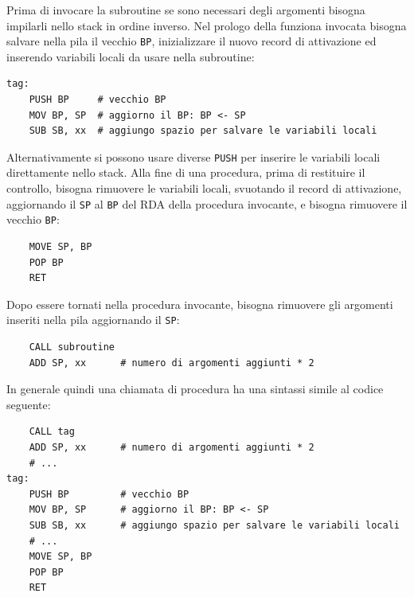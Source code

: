 \documentclass{article}
\numberwithin{equation}{subsection}
\begin{document}
Prima di invocare la subroutine se sono necessari degli argomenti bisogna impilarli nello stack in ordine inverso. 
Nel prologo della funziona invocata bisogna salvare nella pila il vecchio \verb|BP|, inizializzare il nuovo record di attivazione ed inserendo variabili locali da usare nella 
subroutine:
\begin{verbatim}
tag:
    PUSH BP     # vecchio BP
    MOV BP, SP  # aggiorno il BP: BP <- SP
    SUB SB, xx  # aggiungo spazio per salvare le variabili locali
\end{verbatim}
Alternativamente si possono usare diverse \verb|PUSH| per inserire le variabili locali direttamente nello stack. Alla fine di una procedura, prima di restituire il controllo, 
bisogna rimuovere le variabili locali, svuotando il record di attivazione, aggiornando il \verb|SP| al \verb|BP| del RDA della procedura invocante, e bisogna rimuovere il vecchio \verb|BP|:
\begin{verbatim}
    MOVE SP, BP
    POP BP
    RET
\end{verbatim}
Dopo essere tornati nella procedura invocante, bisogna rimuovere gli argomenti inseriti nella pila aggiornando il \verb|SP|:
\begin{verbatim}
    CALL subroutine
    ADD SP, xx      # numero di argomenti aggiunti * 2
\end{verbatim}

In generale quindi una chiamata di procedura ha una sintassi simile al codice seguente:
\begin{verbatim}
    CALL tag
    ADD SP, xx      # numero di argomenti aggiunti * 2
    # ...
tag:
    PUSH BP         # vecchio BP
    MOV BP, SP      # aggiorno il BP: BP <- SP
    SUB SB, xx      # aggiungo spazio per salvare le variabili locali
    # ...
    MOVE SP, BP
    POP BP
    RET
\end{verbatim}
\end{document}
